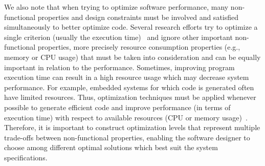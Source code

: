 We also note that when trying to optimize software performance,
many non-functional properties and design constraints must be involved and satisfied simultaneously to better optimize code.
Several research efforts try to optimize a single criterion (usually the execution time)~\cite{ballal2015compiler,chen2012deconstructing,demertzi2011analyzing} and ignore other important non-functional properties, more precisely resource consumption properties (e.g., memory or CPU usage) that must be taken into consideration and can be equally important in relation to the performance. Sometimes, improving program execution time can result in a high resource usage which may decrease system performance. For example, embedded systems for which code is generated often have limited resources. Thus, optimization techniques must be applied whenever possible to generate efficient code and improve performance (in terms of execution time) with respect to available resources (CPU or memory usage)~\cite{nagiub2013automatic}.
Therefore, it is important to construct optimization levels that represent multiple trade-offs between non-functional properties, enabling the software designer to choose among different optimal solutions which best suit the system specifications.




 

